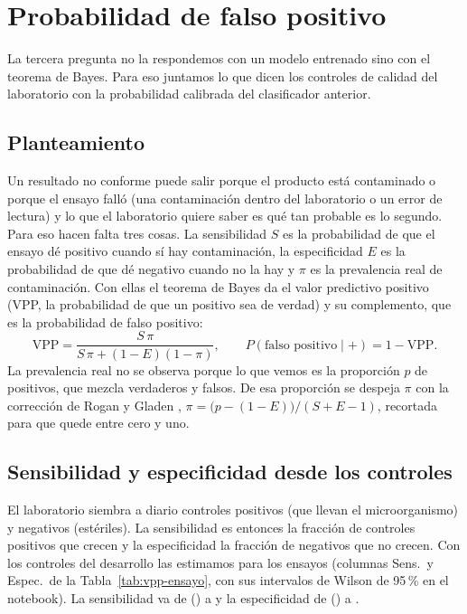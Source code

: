 \section{Probabilidad de falso positivo}
\label{sec:bayes}

La tercera pregunta no la respondemos con un modelo entrenado sino con el
teorema de Bayes. Para eso juntamos lo que dicen los controles de calidad del
laboratorio con la probabilidad calibrada del clasificador anterior.

\subsection{Planteamiento}

Un resultado no conforme puede salir porque el producto está contaminado o
porque el ensayo falló (una contaminación dentro del laboratorio o un error
de lectura) y lo que el laboratorio quiere saber es qué tan probable es lo
segundo. Para eso hacen falta tres cosas. La sensibilidad $S$ es la
probabilidad de que el ensayo dé positivo cuando sí hay contaminación, la
especificidad $E$ es la probabilidad de que dé negativo cuando no la hay y
$\pi$ es la prevalencia real de contaminación. Con ellas el teorema de Bayes
da el valor predictivo positivo (VPP, la probabilidad de que un positivo sea
de verdad) y su complemento, que es la probabilidad de falso positivo:
\[
\mathrm{VPP}=\frac{S\,\pi}{S\,\pi+(1-E)(1-\pi)},\qquad
P(\text{falso positivo}\mid +)=1-\mathrm{VPP}.
\]
La prevalencia real no se observa porque lo que vemos es la proporción $p$
de positivos, que mezcla verdaderos y falsos. De esa proporción se despeja
$\pi$ con la corrección de Rogan y Gladen \cite{rogan1978},
$\pi=\bigl(p-(1-E)\bigr)/(S+E-1)$, recortada para que quede entre cero y uno.

\subsection{Sensibilidad y especificidad desde los controles}

El laboratorio siembra a diario controles positivos (que llevan el
microorganismo) y negativos (estériles). La sensibilidad es entonces la
fracción de controles positivos que crecen y la especificidad la fracción de
negativos que no crecen. Con los \ClfControlesDesarrollo{} controles del
desarrollo las estimamos para los \ClfEnsayos{} ensayos (columnas Sens.\ y
Espec.\ de la Tabla~\ref{tab:vpp-ensayo}, con sus intervalos de Wilson de
95\,\% en el notebook). La sensibilidad va de \ClfSensMin{}
(\textit{\ClfSensMinEnsayo}) a \ClfSensMax{} y la especificidad de
\ClfEspecMin{} (\ClfEspecMinEnsayo) a \ClfEspecMax{}.

